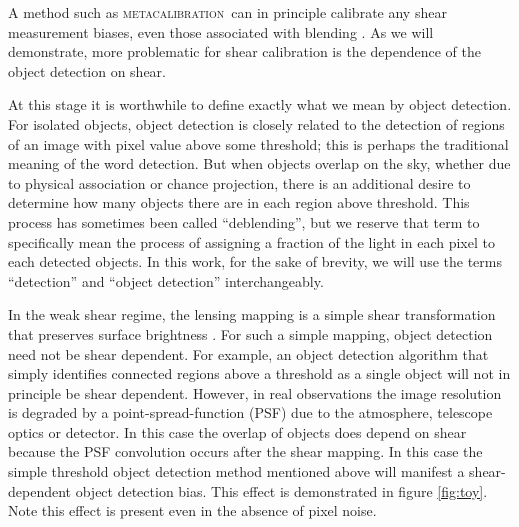 \documentclass[fleqn,useAMS,usenatbib]{mnras}
\newcommand{\mcal}{\textsc{metacalibration}}
\begin{document}
A method such as \mcal\ can in principle calibrate any shear measurement
biases, even those associated with blending \citep[for discussion of blending
effects see, e.g.,][]{DawsonBlending2016}. As we will demonstrate, more
problematic for shear calibration is the dependence of the object detection on
shear.

At this stage it is worthwhile to define exactly what we mean by object
detection.  For isolated objects, object detection is closely related to the
detection of regions of an image with pixel value above some threshold; this is
perhaps the traditional meaning of the word detection. But when objects overlap
on the sky, whether due to physical association or chance projection, there is
an additional desire to determine how many objects there are in each region
above threshold.  This process has sometimes been called ``deblending'', but we
reserve that term to specifically mean the process of assigning a fraction of
the light in each pixel to each detected objects.  In this work, for the sake
of brevity, we will use the terms ``detection'' and ``object detection''
interchangeably.

In the weak shear regime, the lensing mapping is a simple shear transformation
that preserves surface brightness \citep{SchneiderBook92}. For such a simple
mapping, object detection need not be shear dependent. For example, an object
detection algorithm that simply identifies connected regions above a threshold
as a single object will not in principle be shear dependent. However, in real
observations the image resolution is degraded by a point-spread-function (PSF)
due to the atmosphere, telescope optics or detector. In this case the overlap
of objects does depend on shear because the PSF convolution occurs after the
shear mapping.  In this case the simple threshold object detection method
mentioned above will manifest a shear-dependent object detection bias. This
effect is demonstrated in figure \ref{fig:toy}.  Note this effect is present
even in the absence of pixel noise.
\end{document}

